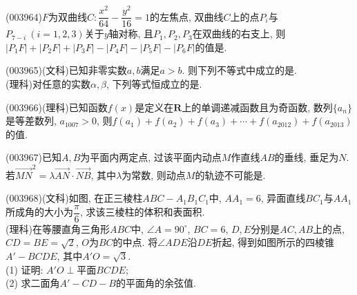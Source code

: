 \item (003964)$F$为双曲线$C: \dfrac{x^2}{64}-\dfrac{y^2}{16}=1$的左焦点, 双曲线$C$上的点$P_i$与$P_{7-i} \ (i=1,2,3)$关于$y$轴对称, 且$P_1,P_2,P_3$在双曲线的右支上, 则$|P_1F|+|P_2F|+|P_3F|-|P_4F|-|P_5F|-|P_6F|$的值是.
\item (003965)(文科)已知非零实数$a,b$满足$a>b$. 则下列不等式中成立的是.
\\
(理科)对任意的实数$\alpha,\beta$, 下列等式恒成立的是.
\item (003966)(理科)已知函数$f(x)$是定义在$\mathbf{R}$上的单调递减函数且为奇函数, 数列$\{a_n\}$是等差数列, $a_{1007}>0$, 则$f(a_1)+f(a_2)+f(a_3)+\cdots+f(a_{2012})+f(a_{2013})$的值.
\item (003967)已知$A,B$为平面内两定点, 过该平面内动点$M$作直线$AB$的垂线, 垂足为$N$. 若$\overrightarrow{MN}^2=\lambda \overrightarrow{AN}\cdot\overrightarrow{NB}$, 其中$\lambda$为常数, 则动点$M$的轨迹不可能是.
\item (003968)(文科)如图, 在正三棱柱$ABC-A_1B_1C_1$中, $AA_1=6$, 异面直线$BC_1$与$AA_1$所成角的大小为$\dfrac{\pi}{6}$, 求该三棱柱的体积和表面积.\\
(理科)在等腰直角三角形$ABC$中, $\angle A=90^\circ$, $BC=6$, $D,E$分别是$AC,AB$上的点, $CD=BE=\sqrt{2}$, $O$为$BC$的中点. 将$\angle ADE$沿$DE$折起, 得到如图所示的四棱锥$A'-BCDE$, 其中$A'O=\sqrt{3}$.\\
(1) 证明: $A'O\perp$平面$BCDE$;\\
(2) 求二面角$A'-CD-B$的平面角的余弦值.
